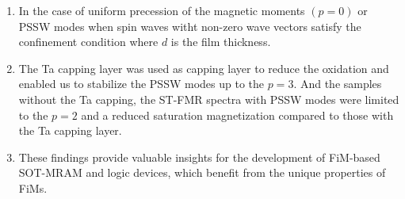\begin{enumerate}[1.]
        \item In the case of uniform precession of the magnetic moments $(p=0)$ or PSSW modes when spin waves witht non-zero wave vectors satisfy the confinement condition  where $d$ is the film thickness.
        \item The Ta capping layer was used as capping layer to reduce the oxidation and enabled us to stabilize the PSSW modes up to the $p=3$. And the samples without the Ta capping, the ST-FMR spectra with PSSW modes were limited to the $p=2$ and a reduced saturation magnetization compared to those with the Ta capping layer.
        \item These findings provide valuable insights for the development of FiM-based SOT-MRAM and logic devices, which benefit from the unique properties of FiMs.
    \end{enumerate}
